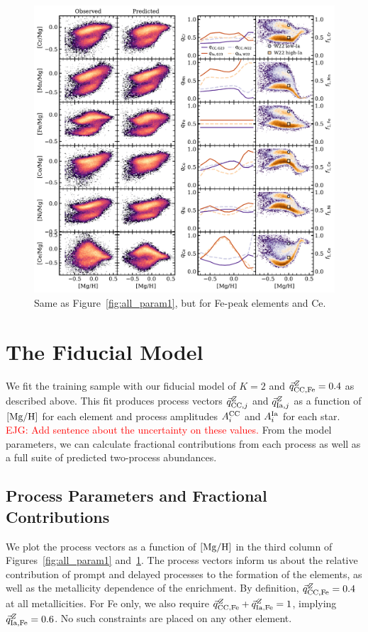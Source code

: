 \documentclass[modern]{aastex631}
\newcommand{\mgh}{[{\rm Mg}/{\rm H}]}
\newcommand{\qcc}{\vec{q}_{{\rm CC,}j}^{Z}}
\newcommand{\qccFe}{\vec{q}_{{\rm CC, Fe}}^{Z}}
\newcommand{\qIa}{\vec{q}_{{\rm Ia,}j}^{Z}}
\newcommand{\qIaFe}{\vec{q}_{{\rm Ia,Fe}}^{Z}}
\newcommand{\Acc}{A^{\rm CC}_{i}}
\newcommand{\AIa}{A^{\rm Ia}_{i}}
\newcommand{\ejg}[1]{\textcolor{red}{EJG: #1}}
\begin{document}
\begin{figure}[htb!]
    \centering
    \includegraphics[width=\textwidth]{Paper/Figures/all_param2.pdf}
    \caption{Same as Figure~\ref{fig:all_param1}, but for Fe-peak elements and Ce.}
    \label{fig:all_param2}
\end{figure}


\section{The Fiducial Model} \label{sec:fiducial}

We fit the training sample with our fiducial model of $K=2$ and $\qccFe = 0.4$ as described above. This fit produces process vectors $\qcc$ and $\qIa$ as a function of $\mgh$ for each element and process amplitudes $\Acc$ and $\AIa$ for each star. \ejg{Add sentence about the uncertainty on these values.} From the model parameters, we can calculate fractional contributions from each process as well as a full suite of predicted two-process abundances.

\subsection{Process Parameters and Fractional Contributions} \label{subsec:parameters}

We plot the process vectors as a function of $\mgh$ in the third column of Figures~\ref{fig:all_param1} and~\ref{fig:all_param2}. The process vectors inform us about the relative contribution of prompt and delayed processes to the formation of the elements, as well as the metallicity dependence of the enrichment. By definition, $\qccFe=0.4$ at all metallicities. For Fe only, we also require $\qccFe + \qIaFe = 1$, implying $\qIaFe=0.6$. No such constraints are placed on any other element. 
\end{document}
